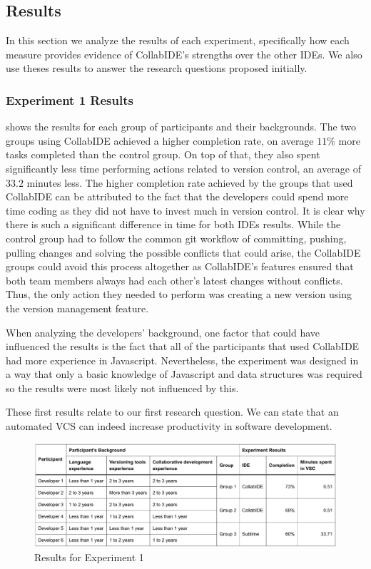 \subsection{Results}

In this section we analyze the results of each experiment, specifically how each measure provides 
evidence of CollabIDE's strengths over the other IDEs. We also use theses results to answer the 
research questions proposed initially.

\subsubsection{Experiment 1 Results}

 shows the results for each group of participants and their 
backgrounds. The two groups using CollabIDE achieved a higher completion rate, on average $11\%$ 
more tasks completed than the control group. On top of that, they 
also spent significantly less time performing actions related to version control, an average of $33.2$  
minutes less. The higher completion rate achieved by the groups 
that used CollabIDE can be attributed to the fact that the developers could spend more time coding as 
they did not have to invest much in version control. It is clear why there is such a significant difference 
in time for both IDEs results. While the control group had to follow the common git workflow of 
committing, pushing, pulling changes and solving the possible conflicts that could arise, the CollabIDE 
groups could avoid this process altogether as CollabIDE’s features ensured that both team members 
always had each other's latest changes without conflicts. Thus, the only action they needed to perform 
was creating a new version using the version management feature.

When analyzing the developers' background, one factor that could have influenced the results is the 
fact that all of the participants that used CollabIDE had more experience in Javascript. Nevertheless, 
the experiment was designed in a way that only a basic knowledge of Javascript and data structures 
was required so the results were most likely not influenced by this.

These first results relate to our first research question. We can state that an 
automated \ac{VCS} can indeed increase productivity in software development.

\begin{figure}[htbp]
  \centering
  \includegraphics[width=1\textwidth]{img/resultsTableCollaborative}
  \caption{Results for Experiment 1}
  \label{fig:resultsTableCollaborative}
\end{figure}

